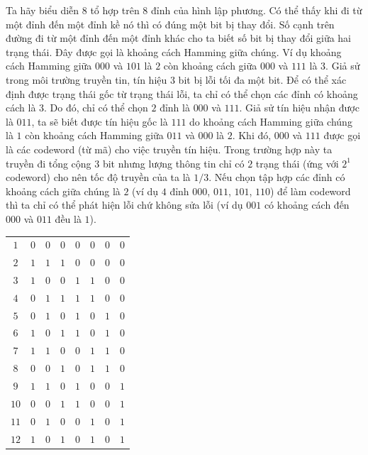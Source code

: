 \begin{multicols}{2}
\begin{figure}[H]
		\vspace*{-10pt}
	\end{figure}
	Ta hãy biểu diễn $8$ tổ hợp trên $8$ đỉnh của hình lập phương. Có thể thấy khi đi từ một đỉnh đến một đỉnh kề nó thì có đúng một bit bị thay đổi. Số cạnh trên đường đi từ một đỉnh đến một đỉnh khác cho ta biết số bit bị thay đổi giữa hai trạng thái. Đây được gọi là khoảng cách Hamming giữa chúng. Ví dụ khoảng cách Hamming giữa $000$ và $101$ là $2$ còn khoảng cách giữa $000$ và $111$ là $3$.
	\vskip 0.05cm
	Giả sử trong môi trường truyền tin, tín hiệu $3$ bit bị lỗi tối đa một bit. Để có thể xác định được trạng thái gốc từ trạng thái lỗi, ta chỉ có thể chọn các đỉnh có khoảng cách là $3$. Do đó, chỉ có thể chọn $2$ đỉnh là $000$ và $111$. Giả sử tín hiệu nhận được là $011$, ta sẽ biết được tín hiệu gốc là $111$ do khoảng cách Hamming giữa chúng là $1$ còn khoảng cách Hamming giữa $011$ và $000$ là $2$. Khi đó, $000$ và $111$ được gọi là các codeword (từ mã) cho việc truyền tín hiệu. Trong trường hợp này ta truyền đi tổng cộng $3$ bit nhưng lượng thông tin chỉ có $2$ trạng thái (ứng với $2^1$ codeword) cho nên tốc độ truyền của ta là $1/3$. Nếu chọn tập hợp các đỉnh có khoảng cách giữa chúng là $2$ (ví dụ $4$ đỉnh $000$, $011$, $101$, $110$) để làm codeword thì ta chỉ có thể phát hiện lỗi chứ không sửa lỗi (ví dụ $001$ có khoảng cách đến $000$ và $011$ đều là $1$).
	\begin{table}[H]
		\vspace*{-5pt}
		\centering
		\captionsetup{labelformat= empty, justification=centering}
		\begin{tabular}{c c c c c c c c}
			\hline
			$1$ &$0$&$0$&$0$&$0$&$0$&$0$&$0$\\
			$2$ &$1$&$1$&$1$&$0$&$0$&$0$&$0$\\
			$3$ &$1$&$0$&$0$&$1$&$1$&$0$&$0$\\
			$4$ &$0$&$1$&$1$&$1$&$1$&$0$&$0$\\
			$5$ &$0$&$1$&$0$&$1$&$0$&$1$&$0$\\
			$6$ &$1$&$0$&$1$&$1$&$0$&$1$&$0$\\
			$7$ &$1$&$1$&$0$&$0$&$1$&$1$&$0$\\
			$8$ &$0$&$0$&$1$&$0$&$1$&$1$&$0$\\
			$9$ &$1$&$1$&$0$&$1$&$0$&$0$&$1$\\
			$10$ &$0$&$0$&$1$&$1$&$0$&$0$&$1$\\
			$11$ &$0$&$1$&$0$&$0$&$1$&$0$&$1$\\
			$12$ &$1$&$0$&$1$&$0$&$1$&$0$&$1$\\

\end{tabular}
\end{table}
\end{multicols}
